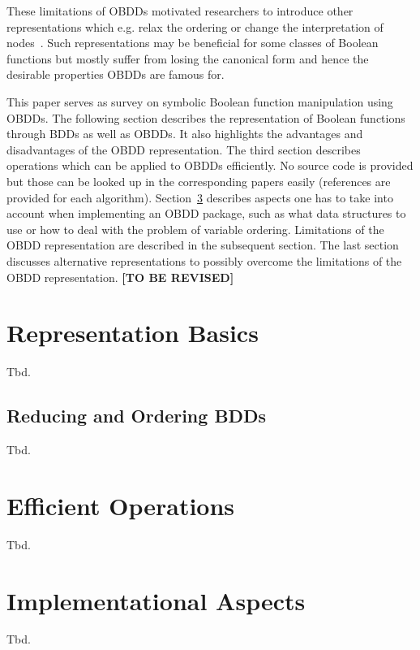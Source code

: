 \documentclass{vldb}
\newcommand{\tbr}{\textbf{[TO BE REVISED]}}
\begin{document}
These limitations of OBDDs motivated researchers to introduce other
representations which e.g. relax the ordering or change the interpretation of
nodes~\cite{BRYANT95}. Such representations may be beneficial for some classes
of Boolean functions but mostly suffer from losing the canonical form and hence
the desirable properties OBDDs are famous for.

This paper serves as survey on symbolic Boolean function manipulation using OBDDs.
The following section describes the representation of Boolean functions through
BDDs as well as OBDDs. It also highlights the advantages and disadvantages of the
OBDD representation. The third section describes operations which can be applied
to OBDDs efficiently. No source code is provided but those can be looked up in
the corresponding papers easily (references are provided for each algorithm).
Section~\ref{sec:implementation-aspects} describes aspects one has to take into
account when implementing an OBDD package, such as what data structures to use
or how to deal with the problem of variable ordering. Limitations of the OBDD
representation are described in the subsequent section. The last section
discusses alternative representations to possibly overcome the limitations of
the OBDD representation.
\tbr

\section{Representation Basics}
\label{sec:representation-basics}

Tbd.

\subsection{Reducing and Ordering BDDs}
\label{subsec:reducing-and-ordering-bdds}

Tbd.

\section{Efficient Operations}
\label{sec:efficient-operations}

Tbd.

\section{Implementational Aspects}
\label{sec:implementation-aspects}

Tbd.
\end{document}
